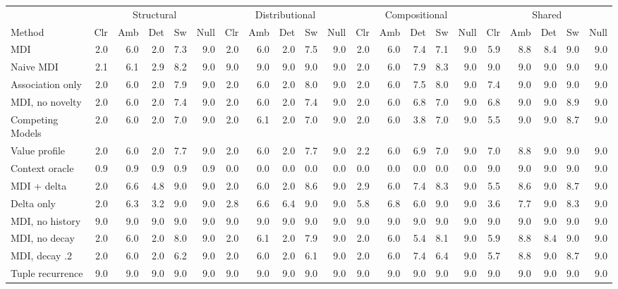 \begin{tabular}{lrrrrrrrrrrrrrrrrrrrr}
\toprule
 & \multicolumn{5}{c}{Structural} & \multicolumn{5}{c}{Distributional} & \multicolumn{5}{c}{Compositional} & \multicolumn{5}{c}{Shared} \\
Method & Clr & Amb & Det & Sw & Null & Clr & Amb & Det & Sw & Null & Clr & Amb & Det & Sw & Null & Clr & Amb & Det & Sw & Null \\
\midrule
MDI & 2.0 & 6.0 & 2.0 & 7.3 & 9.0 & 2.0 & 6.0 & 2.0 & 7.5 & 9.0 & 2.0 & 6.0 & 7.4 & 7.1 & 9.0 & 5.9 & 8.8 & 8.4 & 9.0 & 9.0 \\
Naive MDI & 2.1 & 6.1 & 2.9 & 8.2 & 9.0 & 9.0 & 9.0 & 9.0 & 9.0 & 9.0 & 2.0 & 6.0 & 7.9 & 8.3 & 9.0 & 9.0 & 9.0 & 9.0 & 9.0 & 9.0 \\
Association only & 2.0 & 6.0 & 2.0 & 7.9 & 9.0 & 2.0 & 6.0 & 2.0 & 8.0 & 9.0 & 2.0 & 6.0 & 7.5 & 8.0 & 9.0 & 7.4 & 9.0 & 9.0 & 9.0 & 9.0 \\
MDI, no novelty & 2.0 & 6.0 & 2.0 & 7.4 & 9.0 & 2.0 & 6.0 & 2.0 & 7.4 & 9.0 & 2.0 & 6.0 & 6.8 & 7.0 & 9.0 & 6.8 & 9.0 & 9.0 & 8.9 & 9.0 \\
Competing Models & 2.0 & 6.0 & 2.0 & 7.0 & 9.0 & 2.0 & 6.1 & 2.0 & 7.0 & 9.0 & 2.0 & 6.0 & 3.8 & 7.0 & 9.0 & 5.5 & 9.0 & 9.0 & 8.7 & 9.0 \\
Value profile & 2.0 & 6.0 & 2.0 & 7.7 & 9.0 & 2.0 & 6.0 & 2.0 & 7.7 & 9.0 & 2.2 & 6.0 & 6.9 & 7.0 & 9.0 & 7.0 & 8.8 & 9.0 & 9.0 & 9.0 \\
Context oracle & 0.9 & 0.9 & 0.9 & 0.9 & 0.9 & 0.0 & 0.0 & 0.0 & 0.0 & 0.0 & 0.0 & 0.0 & 0.0 & 0.0 & 0.0 & 9.0 & 9.0 & 9.0 & 9.0 & 9.0 \\
MDI + delta & 2.0 & 6.6 & 4.8 & 9.0 & 9.0 & 2.0 & 6.0 & 2.0 & 8.6 & 9.0 & 2.9 & 6.0 & 7.4 & 8.3 & 9.0 & 5.5 & 8.6 & 9.0 & 8.7 & 9.0 \\
Delta only & 2.0 & 6.3 & 3.2 & 9.0 & 9.0 & 2.8 & 6.6 & 6.4 & 9.0 & 9.0 & 5.8 & 6.8 & 6.0 & 9.0 & 9.0 & 3.6 & 7.7 & 9.0 & 8.3 & 9.0 \\
MDI, no history & 9.0 & 9.0 & 9.0 & 9.0 & 9.0 & 9.0 & 9.0 & 9.0 & 9.0 & 9.0 & 9.0 & 9.0 & 9.0 & 9.0 & 9.0 & 9.0 & 9.0 & 9.0 & 9.0 & 9.0 \\
MDI, no decay & 2.0 & 6.0 & 2.0 & 8.0 & 9.0 & 2.0 & 6.1 & 2.0 & 7.9 & 9.0 & 2.0 & 6.0 & 5.4 & 8.1 & 9.0 & 5.9 & 8.8 & 8.4 & 9.0 & 9.0 \\
MDI, decay .2 & 2.0 & 6.0 & 2.0 & 6.2 & 9.0 & 2.0 & 6.0 & 2.0 & 6.1 & 9.0 & 2.0 & 6.0 & 7.4 & 6.4 & 9.0 & 5.7 & 8.8 & 9.0 & 8.7 & 9.0 \\
Tuple recurrence & 9.0 & 9.0 & 9.0 & 9.0 & 9.0 & 9.0 & 9.0 & 9.0 & 9.0 & 9.0 & 9.0 & 9.0 & 9.0 & 9.0 & 9.0 & 9.0 & 9.0 & 9.0 & 9.0 & 9.0 \\

\end{tabular}
